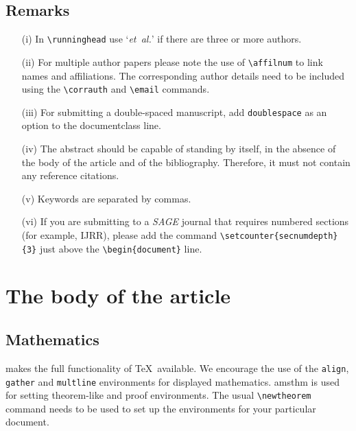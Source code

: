 \documentclass[Afour,sageh,times]{sagej}
\begin{document}
\subsection{Remarks}
\begin{enumerate}
\item[(i)] In \verb"\runninghead" use `\textit{et~al.}' if there
are three or more authors.

\item[(ii)] For multiple author papers please note the use of \verb"\affilnum" to
link names and affiliations. The corresponding author details need to be included using the
\verb+\corrauth+ and \verb+\email+ commands.

\item[(iii)] For submitting a double-spaced manuscript, add
\verb"doublespace" as an option to the documentclass line.

\item[(iv)] The abstract should be capable of standing by itself,
in the absence of the body of the article and of the bibliography.
Therefore, it must not contain any reference citations.

\item[(v)] Keywords are separated by commas.

\item[(vi)] If you are submitting to a \textit{SAGE} journal that requires numbered sections (for example, IJRR), please add the command
  \verb+\setcounter{secnumdepth}{3}+ just above the \verb+\begin{document}+ line.

\end{enumerate}



\section{The body of the article}

\subsection{Mathematics} \textsf{\journalclass} makes the full
functionality of \AmS\/\TeX\ available. We encourage the use of
the \verb"align", \verb"gather" and \verb"multline" environments
for displayed mathematics. \textsf{amsthm} is used for setting
theorem-like and proof environments. The usual \verb"\newtheorem"
command needs to be used to set up the environments for your
particular document.
\end{document}
